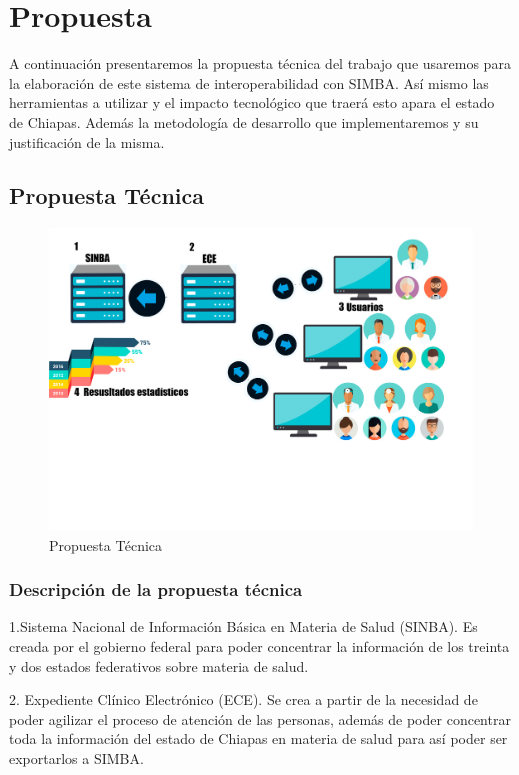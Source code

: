 \chapter{Propuesta} \label{sec:propuesta}

A continuación presentaremos la propuesta técnica del trabajo que usaremos para la elaboración de este sistema de interoperabilidad con SIMBA. Así mismo las herramientas a utilizar y el impacto tecnológico que traerá esto apara el estado de Chiapas. Además la metodología de desarrollo que implementaremos y su justificación de la misma.

\section{Propuesta Técnica}

\begin{figure}[h]
  \centering
  \includegraphics[scale=.1]{lib/assets/propuesta}
  \caption{Propuesta Técnica}
\end{figure}
\subsection{Descripción de la propuesta técnica}
1.Sistema Nacional de Información Básica en Materia de Salud (SINBA). Es creada por el gobierno federal para poder concentrar la información de los treinta y dos estados federativos sobre materia de salud.

2. Expediente Clínico Electrónico (ECE). Se crea a partir de la necesidad de poder agilizar el proceso de atención de las personas, además de poder concentrar toda la información del estado de Chiapas en materia de salud para así poder ser exportarlos a SIMBA.

